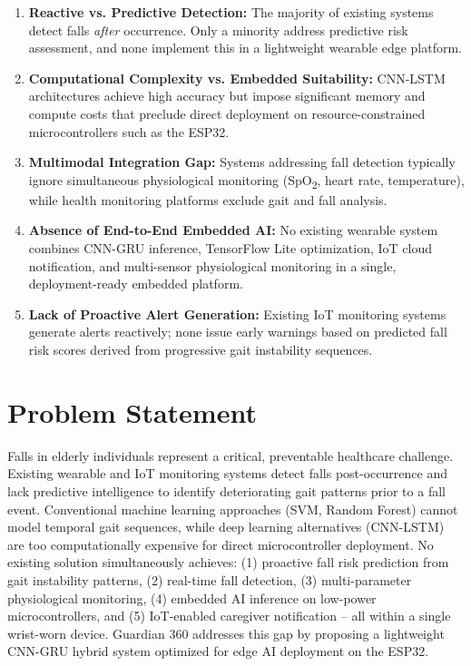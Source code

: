 \documentclass[conference]{IEEEtran}
\begin{document}
\begin{enumerate}
  \item \textbf{Reactive vs. Predictive Detection:} The majority of existing systems detect falls \textit{after} occurrence. Only a minority \cite{lim2024, ishaq2026} address predictive risk assessment, and none implement this in a lightweight wearable edge platform.

  \item \textbf{Computational Complexity vs. Embedded Suitability:} CNN-LSTM architectures achieve high accuracy \cite{zhang2025, gaud2025} but impose significant memory and compute costs that preclude direct deployment on resource-constrained microcontrollers such as the ESP32.

  \item \textbf{Multimodal Integration Gap:} Systems addressing fall detection typically ignore simultaneous physiological monitoring (SpO\textsubscript{2}, heart rate, temperature), while health monitoring platforms \cite{bandara2020, alkhafajiy2019} exclude gait and fall analysis.

  \item \textbf{Absence of End-to-End Embedded AI:} No existing wearable system combines CNN-GRU inference, TensorFlow Lite optimization, IoT cloud notification, and multi-sensor physiological monitoring in a single, deployment-ready embedded platform.

  \item \textbf{Lack of Proactive Alert Generation:} Existing IoT monitoring systems \cite{setu2024smart, pasrija2025} generate alerts reactively; none issue early warnings based on predicted fall risk scores derived from progressive gait instability sequences.
\end{enumerate}

\section{Problem Statement}

Falls in elderly individuals represent a critical, preventable healthcare challenge. Existing wearable and IoT monitoring systems detect falls post-occurrence and lack predictive intelligence to identify deteriorating gait patterns prior to a fall event. Conventional machine learning approaches (SVM, Random Forest) cannot model temporal gait sequences, while deep learning alternatives (CNN-LSTM) are too computationally expensive for direct microcontroller deployment. No existing solution simultaneously achieves: (1) proactive fall risk prediction from gait instability patterns, (2) real-time fall detection, (3) multi-parameter physiological monitoring, (4) embedded AI inference on low-power microcontrollers, and (5) IoT-enabled caregiver notification -- all within a single wrist-worn device. Guardian 360 addresses this gap by proposing a lightweight CNN-GRU hybrid system optimized for edge AI deployment on the ESP32.
\end{document}
